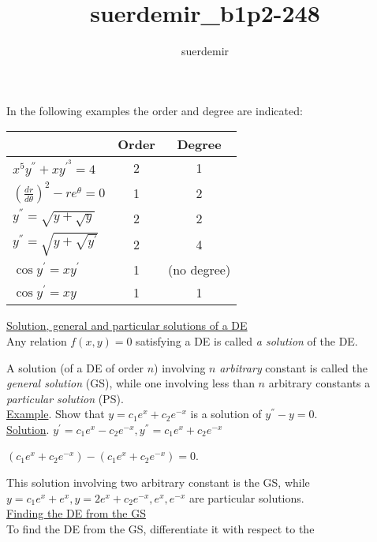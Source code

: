 \documentclass[11pt]{amsbook}
\title{suerdemir_b1p2-248}
\author{suerdemir}
\newcommand\ddfrac[2]{\frac{\displaystyle #1}{\displaystyle #2}}
\begin{document}

In the following examples the order and degree are indicated:\\

\begin{center}
	\begin{tabular}{l c c}
		& Order & Degree \\
		\hline
		\vspace{0.5cm}
		$ x^{5}y^{''} + xy^{{'}^{3}} = 4 $ & 2 & 1 \\
		\vspace{0.5cm}
		$ (\ddfrac{dr}{d\theta})^{2} - re^{\theta} = 0 $ & 1 & 2 \\
		\vspace{0.5cm}
		$ y^{''} = \sqrt{y + \sqrt{y}} $ & 2 & 2 \\
		\vspace{0.5cm}
		$ y^{''} = \sqrt{y + \sqrt{y^{'}}} $ & 2 & 4 \\
		\vspace{0.5cm}
		$ \cos{y^{'}} = xy^{'} $ & 1 & (no degree) \\
		\vspace{0.5cm}
		$ \cos{y^{'}} = xy $ & 1 & 1 \\
	\end{tabular}
\end{center}

\underline{Solution, general and particular solutions of a DE} \\

Any relation $ f(x, y) = 0 $ satisfying a DE is called \textit{a solution} of the DE.

A solution (of a DE of order $ n $) involving $ n $ \textit{arbitrary} constant is called the
\textit{general solution} (GS), while one involving less than $ n $ arbitrary constants a
\textit{particular solution} (PS). \\

\underline{Example}. Show that $ y = c_1e^{x} + c_2e^{-x} $ is a solution of
$ y^{''} - y = 0 $. \\

\underline{Solution}. $ y^{'} = c_1e^{x} - c_2e^{-x}, y^{''} = c_1e^{x}+ c_2e^{-x} $
\begin{center}
	\Rightarrow $ (c_1e^{x} + c_2e^{-x}) - (c_1e^{x} + c_2e^{-x}) = 0 $. \\
\end{center}

This solution involving two arbitrary constant is the GS, while
$ y = c_1e^{x} + e^{x}, y = 2e^{x} + c_2e^{-x}, e^{x}, e^{-x} $ are particular solutions. \\

\underline{Finding the DE from the GS} \\

To find the DE from the GS, differentiate it with respect to the
\end{document}
